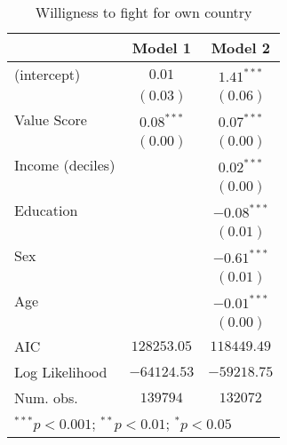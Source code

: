 
\begin{table}
\begin{center}
\begin{tabular}{l c c}
\toprule
 & Model 1 & Model 2 \\
\midrule
(intercept)      & $0.01$       & $1.41^{***}$  \\
                 & $(0.03)$     & $(0.06)$      \\
Value Score      & $0.08^{***}$ & $0.07^{***}$  \\
                 & $(0.00)$     & $(0.00)$      \\
Income (deciles) &              & $0.02^{***}$  \\
                 &              & $(0.00)$      \\
Education        &              & $-0.08^{***}$ \\
                 &              & $(0.01)$      \\
Sex              &              & $-0.61^{***}$ \\
                 &              & $(0.01)$      \\
Age              &              & $-0.01^{***}$ \\
                 &              & $(0.00)$      \\
\midrule
AIC              & $128253.05$  & $118449.49$   \\
Log Likelihood   & $-64124.53$  & $-59218.75$   \\
Num. obs.        & $139794$     & $132072$      \\
\bottomrule
\multicolumn{3}{l}{\scriptsize{$^{***}p<0.001$; $^{**}p<0.01$; $^{*}p<0.05$}}
\end{tabular}
\caption{Willigness to fight for own country}
\label{FCreg}
\end{center}
\end{table}
